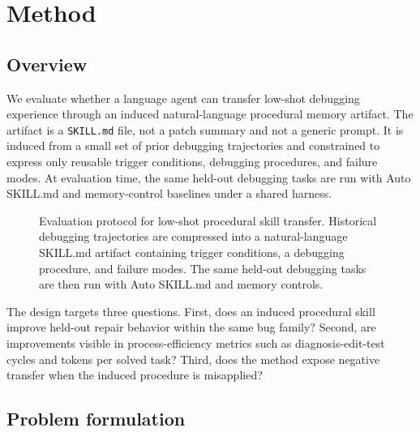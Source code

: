 \section{Method}
\label{sec:method}

\subsection{Overview}
\label{sec:method_overview}

We evaluate whether a language agent can transfer low-shot debugging experience through an induced natural-language procedural memory artifact. The artifact is a \texttt{SKILL.md} file, not a patch summary and not a generic prompt. It is induced from a small set of prior debugging trajectories and constrained to express only reusable trigger conditions, debugging procedures, and failure modes. At evaluation time, the same held-out debugging tasks are run with Auto SKILL.md and memory-control baselines under a shared harness.

\begin{figure}[t]
\centering

\caption{Evaluation protocol for low-shot procedural skill transfer. Historical debugging trajectories are compressed into a natural-language SKILL.md artifact containing trigger conditions, a debugging procedure, and failure modes. The same held-out debugging tasks are then run with Auto SKILL.md and memory controls.}
\label{fig:evaluation_protocol}
\end{figure}

The design targets three questions. First, does an induced procedural skill improve held-out repair behavior within the same bug family? Second, are improvements visible in process-efficiency metrics such as diagnosis-edit-test cycles and tokens per solved task? Third, does the method expose negative transfer when the induced procedure is misapplied?

\subsection{Problem formulation}
\label{sec:method_problem}

